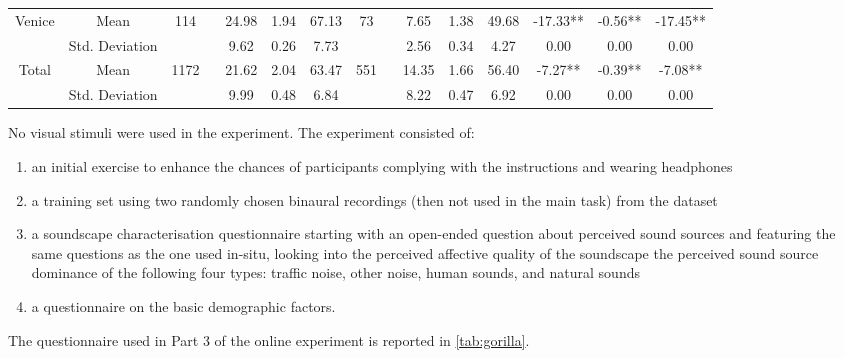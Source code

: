 \begin{table}
{\begin{tabular}{cc|cccc|cccc|ccc}
Venice & Mean & \multirow{2}{*}{114 ~} & 24.98 & 1.94 & 67.13 & \multirow{2}{*}{73 ~} & 7.65 & 1.38 & 49.68 & -17.33** & -0.56** & -17.45** \\
~ & Std.  Deviation &  & 9.62 & 0.26 & 7.73 &  & 2.56 & 0.34 & 4.27 & 0.00 & 0.00 & 0.00 \\ 
\hline
Total & Mean & \multirow{2}{*}{1172 ~} & 21.62 & 2.04 & 63.47 & \multirow{2}{*}{551 ~} & 14.35 & 1.66 & 56.40 & -7.27** & -0.39** & -7.08** \\
 & Std. Deviation &  & 9.99 & 0.48 & 6.84 &  & 8.22 & 0.47 & 6.92 & 0.00 & 0.00 & 0.00 \\
\bottomrule
\end{tabular}
}
\end{table}

   No visual stimuli were used in the experiment. The experiment consisted of:

   \begin{enumerate}
     \item an initial exercise to enhance the chances of participants complying with the instructions and wearing headphones
     \item a training set using two randomly chosen binaural recordings (then not used in the main task) from the dataset
     \item a soundscape characterisation questionnaire starting with an open-ended question about perceived sound sources and featuring the same questions as the one used in-situ, looking into the perceived affective quality of the soundscape the perceived sound source dominance of the following four types: traffic noise, other noise, human sounds, and natural sounds
     \item a questionnaire on the basic demographic factors.
   \end{enumerate}

   The questionnaire used in Part 3 of the online experiment is reported in \cref{tab:gorilla}.

